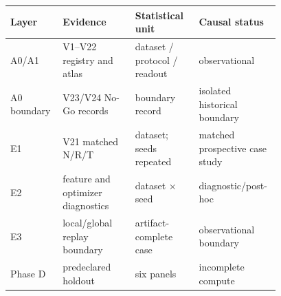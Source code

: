 {\small
\setlength{\tabcolsep}{2pt}
\begin{tabular}{@{}p{0.13\linewidth}p{0.25\linewidth}p{0.22\linewidth}p{0.18\linewidth}@{}}
\toprule
Layer & Evidence & Statistical unit & Causal status \\
\midrule
A0/A1 & V1--V22 registry and atlas & dataset / protocol / readout & observational \\
A0 boundary & V23/V24 No-Go records & boundary record & isolated historical boundary \\
E1 & V21 matched N/R/T & dataset; seeds repeated & matched prospective case study \\
E2 & feature and optimizer diagnostics & dataset $\times$ seed & diagnostic/post-hoc \\
E3 & local/global replay boundary & artifact-complete case & observational boundary \\
Phase D & predeclared holdout & six panels & incomplete compute \\
\bottomrule
\end{tabular}
}

